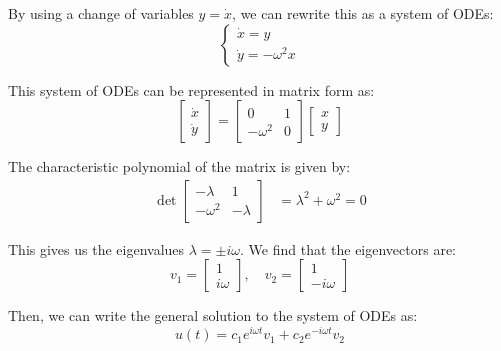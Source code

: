 By using a change of variables $y = \dot{x}$, we can rewrite this as a system of ODEs:
\begin{equation*}
\begin{cases}
\dot{x} = y \\
\dot{y} = -\omega^2 x
\end{cases}
\end{equation*}

This system of ODEs can be represented in matrix form as:
\begin{equation*}
\begin{bmatrix}
\dot{x} \\
\dot{y}
\end{bmatrix} =
\begin{bmatrix}
0 & 1 \\
-\omega^2 & 0
\end{bmatrix}
\begin{bmatrix}
x \\
y
\end{bmatrix}
\end{equation*}

The characteristic polynomial of the matrix is given by:
\begin{align*}
\det \begin{bmatrix}
-\lambda & 1 \\
-\omega^2 & -\lambda
\end{bmatrix} &=
\lambda^2 + \omega^2 = 0
\end{align*}

This gives us the eigenvalues $\lambda = \pm i \omega$. We find that the eigenvectors are: 
\begin{equation*}
v_1 = \begin{bmatrix}
1 \\
i \omega
\end{bmatrix}, \quad v_2 = \begin{bmatrix}
1 \\
- i \omega
\end{bmatrix}
\end{equation*}

Then, we can write the general solution to the system of ODEs as:
\begin{equation*}
u(t) = c_1 e^{i \omega t} v_1 + c_2 e^{- i \omega t} v_2
\end{equation*}

